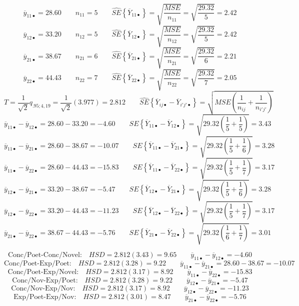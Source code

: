 \documentclass[
]{book}
\begin{document}
\[
\overline{y}_{11\bullet} = 28.60 \qquad n_{11}=5 \qquad 
\hat{SE}\left\{\overline{Y}_{11\bullet}\right\}=\sqrt{\frac{MSE}{n_{11}}}=\sqrt{\frac{29.32}{5}}=2.42
\] \[
\overline{y}_{12\bullet} = 33.20 \qquad n_{12}=5 \qquad 
\hat{SE}\left\{\overline{Y}_{12\bullet}\right\}=\sqrt{\frac{MSE}{n_{12}}}=\sqrt{\frac{29.32}{5}}=2.42
\] \[
\overline{y}_{21\bullet} = 38.67 \qquad n_{21}=6 \qquad 
\hat{SE}\left\{\overline{Y}_{21\bullet}\right\}=\sqrt{\frac{MSE}{n_{21}}}=\sqrt{\frac{29.32}{6}}=2.21
\] \[
\overline{y}_{22\bullet} = 44.43 \qquad n_{22}=7 \qquad 
\hat{SE}\left\{\overline{Y}_{22\bullet}\right\}=\sqrt{\frac{MSE}{n_{22}}}=\sqrt{\frac{29.32}{7}}=2.05
\] \[
T = \frac{1}{\sqrt{2}}q_{.95;4,19}=\frac{1}{\sqrt{2}}(3.977)=2.812 
\qquad
\hat{SE}\left\{\overline{Y}_{ij\bullet}-\overline{Y}_{i'j'\bullet}\right\}=
\sqrt{MSE\left(\frac{1}{n_{ij}}+\frac{1}{n_{i'j'}}\right)}
\] \[
\overline{y}_{11\bullet}-\overline{y}_{12\bullet} = 28.60-33.20=-4.60 \qquad
\hat{SE}\left\{\overline{Y}_{11\bullet}-\overline{Y}_{12\bullet}\right\} =
\sqrt{29.32\left(\frac{1}{5}+\frac{1}{5}\right)}=3.43 
\] \[
\overline{y}_{11\bullet}-\overline{y}_{21\bullet} = 28.60-38.67=-10.07 \qquad
\hat{SE}\left\{\overline{Y}_{11\bullet}-\overline{Y}_{21\bullet}\right\} =
\sqrt{29.32\left(\frac{1}{5}+\frac{1}{6}\right)}=3.28 
\] \[
\overline{y}_{11\bullet}-\overline{y}_{22\bullet} = 28.60-44.43=-15.83 \qquad
\hat{SE}\left\{\overline{Y}_{11\bullet}-\overline{Y}_{22\bullet}\right\} =
\sqrt{29.32\left(\frac{1}{5}+\frac{1}{7}\right)}=3.17 
\] \[
\overline{y}_{12\bullet}-\overline{y}_{21\bullet} = 33.20-38.67=-5.47 \qquad
\hat{SE}\left\{\overline{Y}_{12\bullet}-\overline{Y}_{21\bullet}\right\} =
\sqrt{29.32\left(\frac{1}{5}+\frac{1}{6}\right)}=3.28 
\] \[
\overline{y}_{12\bullet}-\overline{y}_{22\bullet} = 33.20-44.43=-11.23 \qquad
\hat{SE}\left\{\overline{Y}_{12\bullet}-\overline{Y}_{22\bullet}\right\} =
\sqrt{29.32\left(\frac{1}{5}+\frac{1}{7}\right)}=3.17 
\] \[
\overline{y}_{21\bullet}-\overline{y}_{22\bullet} = 38.67-44.43=-5.76 \qquad
\hat{SE}\left\{\overline{Y}_{21\bullet}-\overline{Y}_{22\bullet}\right\} =
\sqrt{29.32\left(\frac{1}{6}+\frac{1}{7}\right)}=3.01 
\]

\[
\mbox{Conc/Poet-Conc/Novel:} \quad  HSD=2.812(3.43)=9.65 \qquad 
\overline{y}_{11\bullet}-\overline{y}_{12\bullet} =-4.60
\] \[
\mbox{Conc/Poet-Exp/Poet:} \quad  HSD=2.812(3.28)=9.22 \qquad 
\overline{y}_{11\bullet}-\overline{y}_{21\bullet} = 28.60-38.67=-10.07
\] \[
\mbox{Conc/Poet-Exp/Novel:} \quad  HSD=2.812(3.17)=8.92 \qquad 
\overline{y}_{11\bullet}-\overline{y}_{22\bullet} =-15.83
\] \[
\mbox{Conc/Nov-Exp/Poet:} \quad  HSD=2.812(3.28)=9.22 \qquad 
\overline{y}_{12\bullet}-\overline{y}_{21\bullet} = -5.47
\] \[
\mbox{Conc/Nov-Exp/Nov:} \quad  HSD=2.812(3.17)=8.92 \qquad 
\overline{y}_{12\bullet}-\overline{y}_{22\bullet} = -11.23
\] \[
\mbox{Exp/Poet-Exp/Nov:} \quad  HSD=2.812(3.01)=8.47 \qquad 
\overline{y}_{21\bullet}-\overline{y}_{22\bullet} = -5.76
\]
\end{document}
